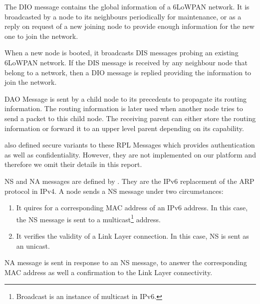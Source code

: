 \begin{description}[style=nextline]
	\begin{description}[style=nextline]
		\item[\textbf{DAG Information Object (DIO) Message}]
		The DIO message contains the global information of a 6LoWPAN network. It is broadcasted by a node to its neighbours periodically for maintenance, or as a reply on request of a new joining node to provide enough information for the new one to join the network.
		\item[\textbf{DAG Information Solicitation (DIS) Message}]
		When a new node is booted, it broadcasts DIS messages probing an existing 6LoWPAN network. If the DIS message is received by any neighbour node that belong to a network, then a DIO message is replied providing the information to join the network.
		\item[\textbf{Destination Advertisement Object (DAO) Message}]
		DAO Message is sent by a child node to its precedents to propagate its routing information. The routing information is later used when another node tries to send a packet to this child node. The receiving parent can either store the routing information or forward it to an upper level parent depending on its capability.
	\end{description}
	
	\cite{rfc6550} also defined secure variants to these RPL Messages which provides authentication as well as confidentiality. However, they are not implemented on our platform and therefore we omit their details in this report.
	
	\item[Neighbour Solicitation (NS) and Neighbour Advertisement (NA)]
	NS and NA messages are defined by \cite{rfc4861}. They are the IPv6 replacement of the ARP protocol in IPv4. A node sends a NS message under two circumstances:
	\begin{enumerate}
		\item It quires for a corresponding MAC address of an IPv6 address. In this case, the NS message is sent to a multicast\footnote{Broadcast is an instance of multicast in IPv6.} address.
		\item It verifies the validity of a Link Layer connection. In this case, NS is sent as an unicast.
	\end{enumerate}
	NA message is sent in response to an NS message, to answer the corresponding MAC address as well a confirmation to the Link Layer connectivity.
	
\end{description}


